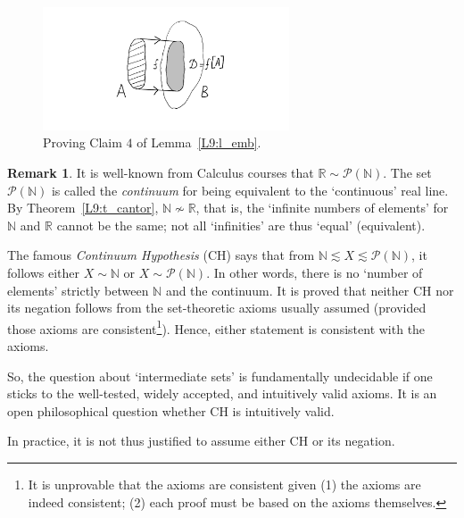 \documentclass[12pt,notitlepage]{article}
\theoremstyle{plain}
\theoremstyle{definition}
\newtheorem{rem}[thm]{Remark}
\theoremstyle{plain}
\newcommand{\N}{\mathbb{N}}
\newcommand{\R}{\mathbb{R}}
\newcommand{\mP}{\mathcal{P}}
\newcommand{\1}{\mathbf{1}}
\newcommand{\0}{\mathbf{0}}
\newcommand{\mcomm}[1]{}
\begin{document}
\begin{figure}[h]
\centering
\includegraphics*[width=0.65\textwidth]{embed.pdf}
\caption{Proving Claim $4$ of Lemma~\ref{L9:l_emb}.}
\end{figure}

\mcomm{Clearly, it depends on the calculus course taught which definition of $\R$ they use (if any). An informal discussion of ``infinite binary fractions'' might be helpful here. I recommend to stress the point that there exist non-equivalent infinite sets. Some students manage to ignore this fact even after having studied many mathematical courses.}

\begin{rem}
It is well-known from Calculus courses that $\R \sim \mP(\N)$. The set $\mP(\N)$ is called the \emph{continuum} for being equivalent to the `continuous' real line. By Theorem~\ref{L9:t_cantor}, $\N \nsim \R$, that is, the `infinite numbers of elements' for $\N$ and $\R$ cannot be the same; not all `infinities' are thus `equal' (equivalent).

The famous \emph{Continuum Hypothesis} (CH) says that from $\N \lesssim X \lesssim \mP(\N)$, it follows either $X \sim \N$ or $X \sim \mP(\N)$. In other words, there is no `number of elements' strictly between $\N$ and the continuum. It is proved that neither CH nor its negation follows from the set-theoretic axioms usually assumed (provided those axioms are consistent\footnote{It is unprovable that the axioms are consistent given (1) the axioms are indeed consistent; (2) each proof must be based on the axioms themselves.}). Hence, either statement is consistent with the axioms.

So, the question about `intermediate sets' is fundamentally undecidable if one sticks to the well-tested, widely accepted, and intuitively valid axioms. It is an open philosophical question whether CH is intuitively valid.  

In practice, it is not thus justified to assume either CH or its negation. 
\end{rem}
\end{document}

